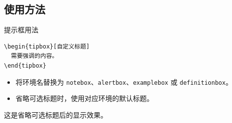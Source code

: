\subsection{使用方法}

\begin{frame}[fragile]{提示框用法}
      \begin{verbatim}
\begin{tipbox}[自定义标题]
  需要强调的内容。
\end{tipbox}
      \end{verbatim}
      \begin{itemize}
            \item 将环境名替换为 \texttt{notebox}、\texttt{alertbox}、\texttt{examplebox} 或 \texttt{definitionbox}。
            \item 省略可选标题时，使用对应环境的默认标题。
      \end{itemize}
      \begin{tipbox}
            这是省略可选标题后的显示效果。
      \end{tipbox}
\end{frame}
